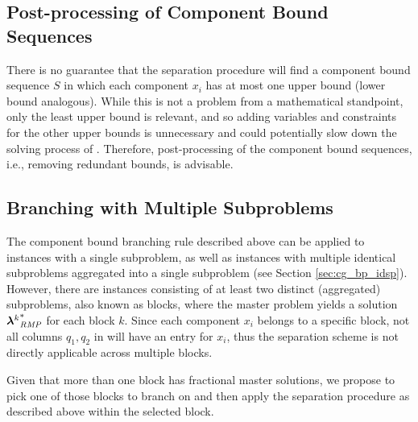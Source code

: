 \subsection{Post-processing of Component Bound Sequences}\label{sec:cmpbnd_separation_postprocessing}
There is no guarantee that the separation procedure will find a component bound sequence $S$ in which each component $x_i$ has at most one upper bound (lower bound analogous). While this is not a problem from a mathematical standpoint, only the least upper bound is relevant, and so adding variables and constraints for the other upper bounds is unnecessary and could potentially slow down the solving process of \SP{}. Therefore, post-processing of the component bound sequences, i.e., removing redundant bounds, is advisable.

\subsection{Branching with Multiple Subproblems}\label{sec:cmpbnd_separation_branching}
The component bound branching rule described above can be applied to instances with a single subproblem, as well as instances with multiple identical subproblems aggregated into a single subproblem (see Section \ref{sec:cg_bp_idsp}). However, there are instances consisting of at least two distinct (aggregated) subproblems, also known as blocks, where the master problem yields a solution ${{\bm{\lambda}}^k}^*_{\textit{RMP}}{}$ for each block $k$. Since each component $x_i$ belongs to a specific block, not all columns $q_1, q_2$ in \RMP{} will have an entry for $x_i$, thus the separation scheme is not directly applicable across multiple blocks.

Given that more than one block has fractional master solutions, we propose to pick one of those blocks to branch on and then apply the separation procedure as described above within the selected block.
